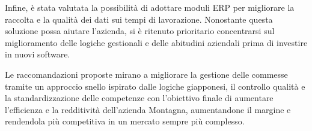 \begin{multicols}{2}
	Infine, è stata valutata la possibilità di adottare moduli ERP per migliorare la raccolta e la qualità dei dati sui tempi di lavorazione. Nonostante questa soluzione possa aiutare l'azienda, si è ritenuto prioritario concentrarsi sul miglioramento delle logiche gestionali e delle abitudini aziendali prima di investire in nuovi software.

	Le raccomandazioni proposte mirano a migliorare la gestione delle commesse tramite un approccio snello ispirato dalle logiche giapponesi, il controllo qualità e la standardizzazione delle competenze con l'obiettivo finale di aumentare l'efficienza e la redditività dell'azienda Montagna, aumentandone il margine e rendendola più competitiva in un mercato sempre più complesso.

\end{multicols}
